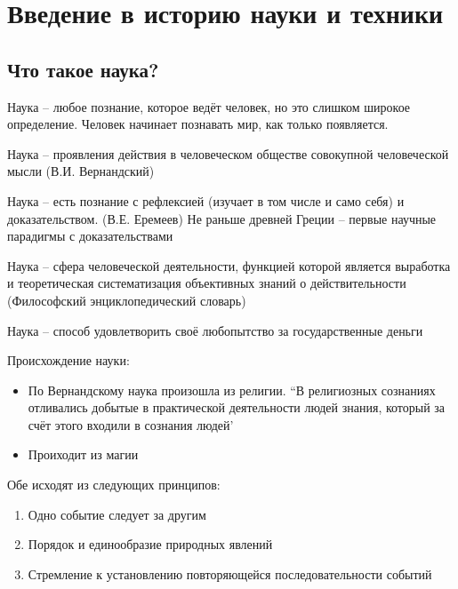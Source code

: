 \documentclass{book}
\theoremstyle{definition}
\begin{document}
    \section{Введение в историю науки и техники}
    \subsection{Что такое наука?}

    \begin{definition}
        Наука -- любое познание, которое ведёт человек, но это слишком широкое определение. Человек начинает познавать мир, как только появляется.

        Наука -- проявления действия в человеческом обществе совокупной человеческой мысли (В.И. Вернандский)

        Наука -- есть познание с рефлексией (изучает в том числе и само себя) и доказательством. (В.Е. Еремеев) Не раньше древней Греции -- первые научные парадигмы с доказательствами

        Наука -- сфера человеческой деятельности, функцией которой является выработка и теоретическая систематизация объективных знаний о действительности (Философский энциклопедический словарь)

        Наука -- способ удовлетворить своё любопытство за государственные деньги
    \end{definition}

    Происхождение науки:
    \begin{itemize}
        \item По Вернандскому наука произошла из религии. ``В религиозных сознаниях отливались добытые в практической деятельности людей знания, который за счёт этого входили в сознания людей'
        \item Проиходит из магии
    \end{itemize}

    Обе исходят из следующих принципов:
    \begin{enumerate}
        \item Одно событие следует за другим
        \item Порядок и единообразие природных явлений
        \item Стремление к установлению повторяющейся последовательности событий 
    \end{enumerate}
\end{document}
